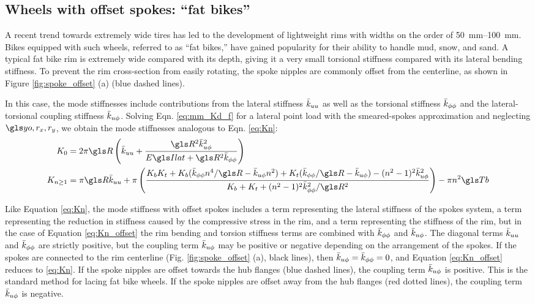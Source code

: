 \documentclass[\rootdir/thesis.tex]{subfiles}
\begin{document}
\subsection{Wheels with offset spokes: ``fat bikes''}
\label{sec:fat_bikes}

A recent trend towards extremely wide tires has led to the development of lightweight rims with widths on the order of \SIrange{50}{100}{mm}. Bikes equipped with such wheels, referred to as ``fat bikes,'' have gained popularity for their ability to handle mud, snow, and sand. A typical fat bike rim is extremely wide compared with its depth, giving it a very small torsional stiffness compared with its lateral bending stiffness. To prevent the rim cross-section from easily rotating, the spoke nipples are commonly offset from the centerline, as shown in Figure \ref{fig:spoke_offset} (a) (blue dashed lines).

In this case, the mode stiffnesses include contributions from the lateral stiffness $\bar{k}_{uu}$ as well as the torsional stiffness $\bar{k}_{\phi\phi}$ and the lateral-torsional coupling stiffness $\bar{k}_{u\phi}$. Solving Eqn. \eqref{eq:mm_Kd_f} for a lateral point load with the smeared-spokes approximation and neglecting $\yo, r_x, r_y$, we obtain the mode stiffnesses analogous to Eqn. \eqref{eq:Kn}:
\begin{subequations}\label{eq:Kn_offset}
\begin{align}
K_0 &= 2\pi\R \left(\kuu + \frac{\R^2\kup^2}{\EIl + \R^2\kpp}\right)\\
K_{n\geq1} & = \pi\R\kuu + \pi\left(\frac{\Kbend \Ktors +
                                          \Kbend(\kpp n^4/\R - \kup n^2) +
                                          \Ktors(\kpp/\R-\kup) -
                                          (n^2-1)^2\kup^2}
                                    {\Kbend + \Ktors + (n^2-1)^2\kpp^2/\R^2}\right)- \pi n^2 \Tb
\end{align}
\end{subequations}


Like Equation \eqref{eq:Kn}, the mode stiffness with offset spokes includes a term representing the lateral stiffness of the spokes system, a term representing the reduction in stiffness caused by the compressive stress in the rim, and a term representing the stiffness of the rim, but in the case of Equation \eqref{eq:Kn_offset} the rim bending and torsion stiffness terms are combined with $\bar{k}_{\phi\phi}$ and $\bar{k}_{u\phi}$. The diagonal terms $\bar{k}_{uu}$ and $\bar{k}_{\phi\phi}$ are strictly positive, but the coupling term $\bar{k}_{u\phi}$ may be positive or negative depending on the arrangement of the spokes. If the spokes are connected to the rim centerline (Fig. \ref{fig:spoke_offset} (a), black lines), then $\bar{k}_{u\phi}=\bar{k}_{\phi\phi}=0$, and Equation \eqref{eq:Kn_offset} reduces to \eqref{eq:Kn}. If the spoke nipples are offset towards the hub flanges (blue dashed lines), the coupling term $\bar{k}_{u\phi}$ is positive. This is the standard method for lacing fat bike wheels. If the spoke nipples are offset away from the hub flanges (red dotted lines), the coupling term $\bar{k}_{u\phi}$ is negative.
\end{document}
